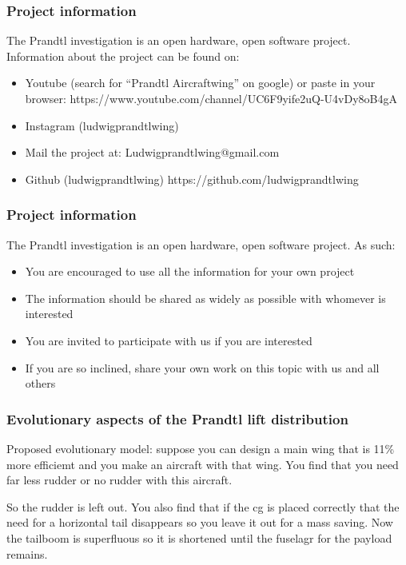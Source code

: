 \documentclass{beamer}
\begin{document}
\begin{frame}
\frametitle{Project information}

The Prandtl investigation is an open hardware, open software project.  Information about the project can be found on:  

\begin{itemize}
\item Youtube (search for ``Prandtl Aircraftwing'' on google) or paste in your browser:
https://www.youtube.com/channel/UC6F9yife2uQ-U4vDy8oB4gA
\item Instagram (ludwigprandtlwing)
\item Mail the project at: Ludwigprandtlwing@gmail.com 
\item Github (ludwigprandtlwing) https://github.com/ludwigprandtlwing
\end{itemize}

\end{frame}




\begin{frame}
\frametitle{Project information}

The Prandtl investigation is an open hardware, open software project.  As such:  

\begin{itemize}
\item You are encouraged to use all the information for your own project
\item The information should be shared as widely as possible with whomever is interested
\item You are invited to participate with us if you are interested
\item If you are so inclined, share your own work on this topic with us and all others
\end{itemize}

\end{frame}

\begin{frame}
\frametitle{Evolutionary aspects of the Prandtl lift distribution}

Proposed evolutionary model: suppose you can design a main wing that is 11\% more efficiemt and you make an aircraft with that wing. You find that you need far less rudder or no rudder with this aircraft.

So the rudder is left out. You also find that if the cg is placed correctly that the need for a horizontal tail disappears so you leave it out for a mass saving. Now the tailboom is superfluous so it is shortened until the fuselagr for the payload remains.

\end{frame}
\end{document}
